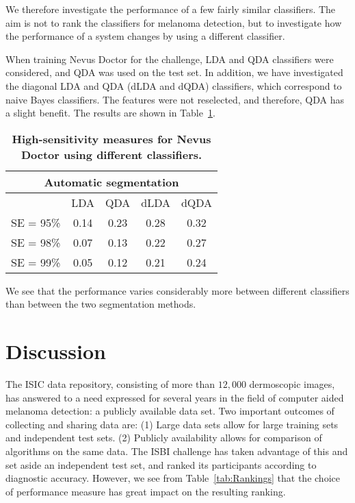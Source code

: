 \documentclass[10pt,letterpaper]{article}
\begin{document}
We therefore investigate the performance of a few fairly similar classifiers. 
The aim is not to rank the classifiers for melanoma detection, but to investigate how the performance of a system changes by using a different classifier. 

When training Nevus Doctor for the challenge, LDA and QDA classifiers were considered, and QDA was used on the test set. 
In addition, we have investigated the diagonal LDA and QDA (dLDA and dQDA) classifiers, which correspond to naive Bayes classifiers. 
The features were not reselected, and therefore, QDA has a slight benefit. 
The results are shown in Table~\ref{tab:Diagonal}. 
\begin{table}[!ht]
\centering
\caption{
{\bf High-sensitivity measures for Nevus Doctor using different classifiers.}}
\begin{tabular}{c | c | c | c | c}
        \multicolumn{5}{c}{Automatic segmentation} \\
        \hline
        & LDA & QDA & dLDA & dQDA \\
        \hline
   SE = 95\% & 0.14 & 0.23 & 0.28 &0.32\\
  SE = 98\% & 0.07 & 0.13 & 0.22 & 0.27 \\
  SE = 99\% & 0.05 & 0.12 & 0.21 & 0.24 
\end{tabular}
\label{tab:Diagonal}
\end{table}
We see that the performance varies considerably more between different classifiers than between the two segmentation methods. 


\section*{Discussion} \label{sec:Discussion} %
The ISIC data repository, consisting of more than $12,000$ dermoscopic images, has answered to a need expressed for several years in the field of computer aided melanoma detection: a publicly available data set. 
Two important outcomes of collecting and sharing data are: 
(1) Large data sets allow for large training sets and independent test sets. (2) Publicly availability allows for comparison of algorithms on the same data.
The ISBI challenge has taken advantage of this and set aside an independent test set, and ranked its participants according to diagnostic accuracy. 
However, we see from Table~\ref{tab:Rankings} that the choice of performance measure has great impact on the resulting ranking. 
\end{document}
